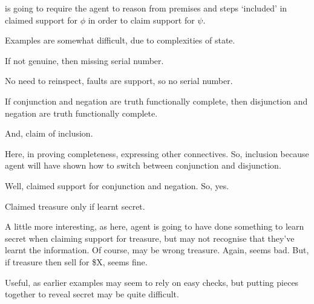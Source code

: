 \begin{note}
  \ESU{} is going to require the agent to reason from premises and steps `included' in claimed support for \(\phi\) in order to claim support for \(\psi\).
\end{note}


\begin{note}[Examples]
  Examples are somewhat difficult, due to complexities of state.
\end{note}

\begin{note}
  \begin{scenario}
    If not genuine, then missing serial number.
  \end{scenario}
  No need to reinspect, faults are support, so no serial number.
\end{note}

\begin{note}
  \begin{scenario}
    If conjunction and negation are truth functionally complete, then disjunction and negation are truth functionally complete.

    And, claim of inclusion.
  \end{scenario}

  Here, in proving completeness, expressing other connectives.
  So, inclusion because agent will have shown how to switch between conjunction and disjunction.

  Well, claimed support for conjunction and negation.
  So, yes.
\end{note}

\begin{note}[Treasure]
  \begin{scenario}
    Claimed treasure only if learnt secret.
  \end{scenario}
  A little more interesting, as here, agent is going to have done something to learn secret when claiming support for treasure, but may not recognise that they've learnt the information.
  Of course, may be wrong treasure.
  Again, seems bad.
  But, if treasure then sell for \$X, seems fine.

  Useful, as earlier examples may seem to rely on easy checks, but putting pieces together to reveal secret may be quite difficult.
\end{note}

